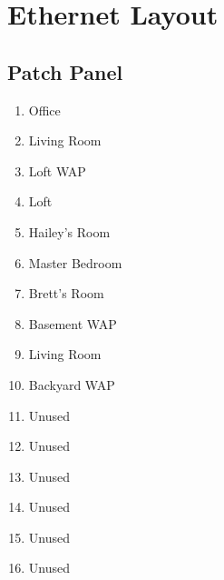 \documentclass[]{article}
\begin{document}

\newpage

\vspace{\baselineskip}\section*{Ethernet Layout}

\begin{multicols}{2}

\subsection{\texorpdfstring{{Patch Panel}}{Patch Panel}}

\begin{enumerate}
\item
  {Office}
\item
  {Living Room}
\item
  {Loft WAP}
\item
  {Loft}
\item
  {Hailey's Room}
\item
  {Master Bedroom}
\item
  {Brett's Room}
\item
  {Basement WAP}
\item
  {Living Room}
\item
  {Backyard WAP}
\item
  {Unused}
\item
  {Unused}
\item
  {Unused}
\item
  {Unused}
\item
  {Unused}
\item
  {Unused}
\end{enumerate}


\end{multicols}
\end{document}
